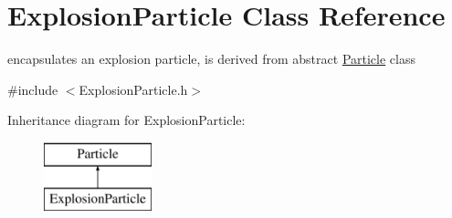 \hypertarget{classExplosionParticle}{\section{Explosion\-Particle Class Reference}
\label{classExplosionParticle}
}


encapsulates an explosion particle, is derived from abstract \hyperlink{classParticle}{Particle} class  




{\ttfamily \#include $<$Explosion\-Particle.\-h$>$}

Inheritance diagram for Explosion\-Particle\-:\begin{figure}[H]
\begin{center}
\leavevmode
\includegraphics[height=2.000000cm]{classExplosionParticle}
\end{center}
\end{figure}
